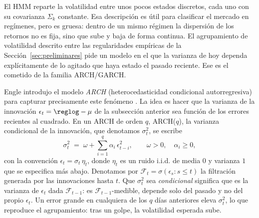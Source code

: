 El HMM reparte la volatilidad entre unos pocos estados discretos, cada uno con su covarianza $\Sigma_k$ constante. Esa descripción es útil para clasificar el mercado en regímenes, pero es gruesa: dentro de un mismo régimen la dispersión de los retornos no es fija, sino que sube y baja de forma continua. El agrupamiento de volatilidad descrito entre las regularidades empíricas de la Sección~\ref{sec:preliminares} pide un modelo en el que la varianza de hoy dependa explícitamente de lo agitado que haya estado el pasado reciente. Ese es el cometido de la familia ARCH/GARCH.

Engle introdujo el modelo \emph{ARCH} (heterocedasticidad condicional autorregresiva) para capturar precisamente este fenómeno \cite{engle1982}. La idea es hacer que la varianza de la innovación $\epsilon_t = \reglog - \mu$ de la subsección anterior sea función de los errores recientes al cuadrado. En un ARCH de orden $q$, ARCH($q$), la varianza condicional de la innovación, que denotamos $\sigma_t^2$, se escribe
\[
\sigma_t^2 \;=\; \omega + \sum_{i=1}^{q} \alpha_i\, \epsilon_{t-i}^2,
\qquad \omega > 0, \quad \alpha_i \ge 0,
\]
con la convención $\epsilon_t = \sigma_t\, \eta_t$, donde $\eta_t$ es un ruido i.i.d. de media $0$ y varianza $1$ que se especifica más abajo. Denotamos por $\mathcal{F}_t = \sigma(\epsilon_s : s \le t)$ la filtración generada por las innovaciones hasta $t$. Que $\sigma_t^2$ sea \emph{condicional} significa que es la varianza de $\epsilon_t$ dada $\mathcal{F}_{t-1}$: es $\mathcal{F}_{t-1}$-medible, depende solo del pasado y no del propio $\epsilon_t$. Un error grande en cualquiera de los $q$ días anteriores eleva $\sigma_t^2$, lo que reproduce el agrupamiento: tras un golpe, la volatilidad esperada sube.

